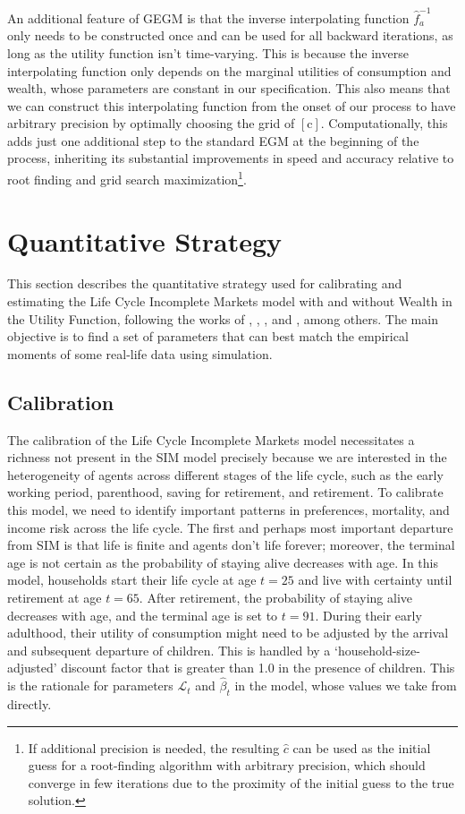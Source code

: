 \documentclass{article}
\newcommand{\DiscFac}{\beta}
\newcommand{\Alive}{\mathcal{L}}
\newcommand{\cNrm}{c}
\newcommand{\cMat}{[\mathrm{\cNrm}]}
\begin{document}
An additional feature of GEGM is that the inverse interpolating function $\hat{f}_{a}^{ -1}$ only needs to be constructed once and can be used for all backward iterations, as long as the utility function isn't time-varying. This is because the inverse interpolating function only depends on the marginal utilities of consumption and wealth, whose parameters are constant in our specification. This also means that we can construct this interpolating function from the onset of our process to have arbitrary precision by optimally choosing the grid of $\cMat$. Computationally, this adds just one additional step to the standard EGM at the beginning of the process, inheriting its substantial improvements in speed and accuracy relative to root finding and grid search maximization\footnote{If additional precision is needed, the resulting $\hat{\cNrm}$ can be used as the initial guess for a root-finding algorithm with arbitrary precision, which should converge in few iterations due to the proximity of the initial guess to the true solution.}.

\section{Quantitative Strategy}\label{Quantitative Strategy}

This section describes the quantitative strategy used for calibrating and estimating the Life Cycle Incomplete Markets model with and without Wealth in the Utility Function, following the works of \cite{Cagetti_2003}, \cite{Palumbo_1999}, \cite{Gourinchas_2002}, and \cite{Sabelhaus_2010}, among others. The main objective is to find a set of parameters that can best match the empirical moments of some real-life data using simulation.

\subsection{Calibration}\label{Calibration}

The calibration of the Life Cycle Incomplete Markets model necessitates a richness not present in the SIM model precisely because we are interested in the heterogeneity of agents across different stages of the life cycle, such as the early working period, parenthood, saving for retirement, and retirement. To calibrate this model, we need to identify important patterns in preferences, mortality, and income risk across the life cycle. The first and perhaps most important departure from SIM is that life is finite and agents don't life forever; moreover, the terminal age is not certain as the probability of staying alive decreases with age. In this model, households start their life cycle at age $t = 25$ and live with certainty until retirement at age $t = 65$. After retirement, the probability of staying alive decreases with age, and the terminal age is set to $t = 91$. During their early adulthood, their utility of consumption might need to be adjusted by the arrival and subsequent departure of children. This is handled by a `household-size-adjusted' discount factor that is greater than 1.0 in the presence of children. This is the rationale for parameters $\Alive_{t}$ and $\hat{\DiscFac}_{t}$ in the model, whose values we take from \cite{Cagetti_2003} directly.
\end{document}
